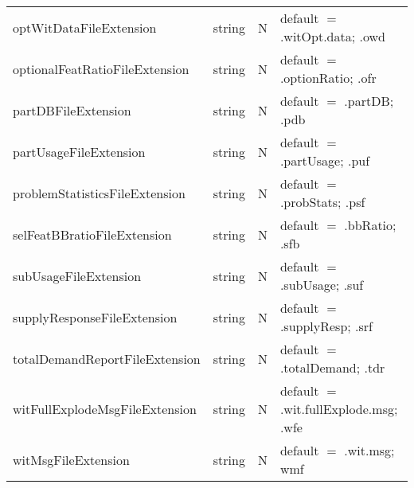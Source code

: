 \begin{tabular}{lllp{3.5in}}
optWitDataFileExtension & string & N & default $=$ .witOpt.data; .owd \\
optionalFeatRatioFileExtension & string & N & default $=$ .optionRatio; .ofr \\
partDBFileExtension & string & N & default $=$ .partDB; .pdb \\
partUsageFileExtension & string & N & default $=$ .partUsage; .puf \\
problemStatisticsFileExtension & string & N & default $=$ .probStats; .psf \\
selFeatBBratioFileExtension & string & N & default $=$ .bbRatio; .sfb \\
subUsageFileExtension & string & N & default $=$ .subUsage; .suf \\
supplyResponseFileExtension & string & N & default $=$ .supplyResp; .srf \\
totalDemandReportFileExtension & string & N & default $=$ .totalDemand; .tdr \\
witFullExplodeMsgFileExtension & string & N & default $=$ .wit.fullExplode.msg; .wfe\\
witMsgFileExtension & string & N & default $=$ .wit.msg; wmf \\
\end{tabular}


